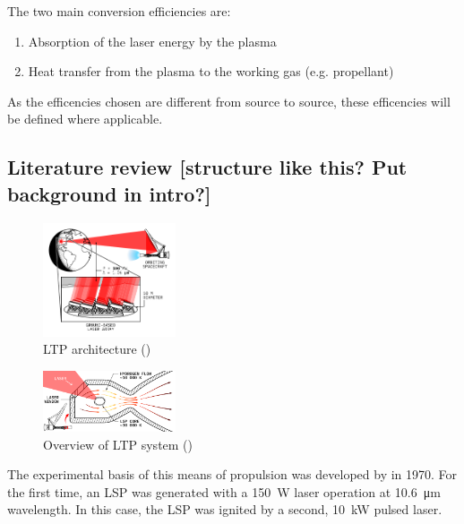        The two main conversion efficiencies are:
        \begin{enumerate}
            \item Absorption of the laser energy by the plasma
            \item Heat transfer from the plasma to the working gas (e.g. propellant)
        \end{enumerate}

    As the efficencies chosen are different from source to source, these efficencies will be defined where applicable.

    \subsection{Literature review [structure like this? Put background in intro?]}
    \begin{figure}[h]
        \centering
        \includegraphics[width=0.35\textwidth]{assets/2 background/ltp_architecture.pdf}
        \caption{LTP architecture (\textcite{duplayArgonLaserPlasmaThruster2024a})}
        \label{fig:LTP architecture}
    \end{figure}

    \begin{figure}[h]
        \centering
        \includegraphics[width=0.35\textwidth]{assets/2 background/chamber.pdf}
        \caption{Overview of LTP system (\textcite{duplayArgonLaserPlasmaThruster2024a})}
        \label{fig:Keefer apparatus}
    \end{figure}
    

    The experimental basis of this means of propulsion was developed by \textcite{generalovContinuousOpticalDischarge1970} in 1970. For the first time, an LSP was generated with a \qty{150}{W}  laser operation at \qty{10.6}{μm} wavelength. In this case, the LSP was ignited by a second, \qty{10}{kW} pulsed  laser.
    
